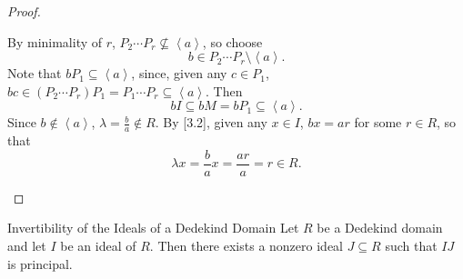\documentclass[pmath441]{subfiles}
\begin{document}
\begin{proof}
\begin{case}
            By minimality of $r$, $P_2\cdots P_r\nsubseteq\left< a \right>$, so choose
            \begin{equation*}
                b \in P_2\cdots P_r \setminus \left< a \right>. 
            \end{equation*}
            Note that $bP_1\subseteq\left< a \right>$, since, given any $c\in P_1$, $bc \in \left( P_2\cdots P_r \right)P_1 = P_1\cdots P_r\subseteq\left< a \right>$. Then
            \begin{equation}
                bI \subseteq bM = bP_1 \subseteq \left< a \right>. 
            \end{equation}
            Since $b\notin\left< a \right>$, $\lambda = \frac{b}{a}\notin R$. By [3.2], given any $x\in I$, $bx = ar$ for some $r\in R$, so that
            \begin{equation*}
                \lambda x = \frac{b}{a}x = \frac{ar}{a} = r\in R.
            \end{equation*}
        \end{case}
    \end{proof}
    
    \begin{prop}{Invertibility of the Ideals of a Dedekind Domain}
        Let $R$ be a Dedekind domain and let $I$ be an ideal of $R$. Then there exists a nonzero ideal $J\subseteq R$ such that $IJ$ is principal.
    \end{prop}
    
\end{document}
